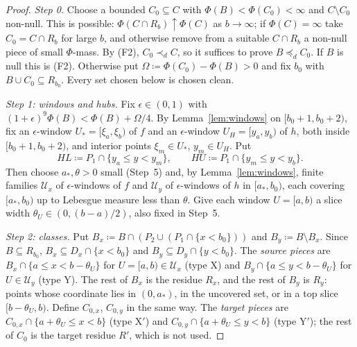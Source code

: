 \documentclass[11pt]{article}
\theoremstyle{definition}\newtheorem{definition}[theorem]{Definition}
\theoremstyle{remark}\newtheorem{remark}[theorem]{Remark}
\begin{document}
\begin{proof}
\emph{Step 0.} Choose a bounded $C_0\subseteq C$ with
$\Phi(B)<\Phi(C_0)<\infty$ and $C\setminus C_0$ non-null. This is possible:
$\Phi(C\cap R_b)\uparrow\Phi(C)$ as $b\to\infty$; if $\Phi(C)=\infty$ take
$C_0=C\cap R_b$ for large $b$, and otherwise remove from a suitable $C\cap
R_b$ a non-null piece of small $\Phi$-mass. By (F2), $C_0\prec_dC$, so it
suffices to prove $B\preceq_dC_0$. If $B$ is null this is (F2). Otherwise put
$\Omega\coloneqq\Phi(C_0)-\Phi(B)>0$ and fix $b_0$ with $B\cup C_0\subseteq
R_{b_0}$. Every set chosen below is chosen clean.

\emph{Step 1: windows and hubs.} Fix $\epsilon\in(0,1)$ with
$(1+\epsilon)^9\Phi(B)<\Phi(B)+\Omega/4$. By Lemma~\ref{lem:windows} on
$[b_0+1,b_0+2)$, fix an $\epsilon$-window $U_*=[\xi_a,\xi_b)$ of $f$ and an
$\epsilon$-window $U_H=[y_a,y_b)$ of $h$, both inside $[b_0+1,b_0+2)$, and
interior points $\xi_m\in U_*$, $y_m\in U_H$. Put
\[
 HL\coloneqq P_1\cap\{y_a\le y<y_m\},\qquad HU\coloneqq P_1\cap\{y_m\le
 y<y_b\}.
\]
Then choose $a_*,\theta>0$ small (Step~5) and, by Lemma~\ref{lem:windows},
finite families $\mathcal U_x$ of $\epsilon$-windows of $f$ and $\mathcal U_y$
of $\epsilon$-windows of $h$ in $[a_*,b_0)$, each covering $[a_*,b_0)$
up to Lebesgue measure less than $\theta$. Give each window $U=[a,b)$ a
slice width $\theta_U\in(0,(b-a)/2)$, also fixed in Step~5.

\emph{Step 2: classes.} Put $B_x\coloneqq B\cap(P_2\cup(P_1\cap\{x<b_0\}))$
and $B_y\coloneqq B\setminus B_x$. Since $B\subseteq R_{b_0}$, $B_x\subseteq
D_x\cap\{x<b_0\}$ and $B_y\subseteq D_y\cap\{y<b_0\}$. The \emph{source
pieces} are $B_x\cap\{a\le x<b-\theta_U\}$ for $U=[a,b)\in\mathcal U_x$ (type
X) and $B_y\cap\{a\le y<b-\theta_U\}$ for $U\in\mathcal U_y$ (type Y). The
rest of $B_x$ is the residue $R_x$, and the rest of $B_y$ is $R_y$: points
whose coordinate lies in $(0,a_*)$, in the uncovered set, or in a top slice
$[b-\theta_U,b)$. Define $C_{0,x}$, $C_{0,y}$ in the same way. The
\emph{target pieces} are $C_{0,x}\cap\{a+\theta_U\le x<b\}$ (type X$'$) and
$C_{0,y}\cap\{a+\theta_U\le y<b\}$ (type Y$'$); the rest of $C_0$ is the
target residue $R'$, which is not used.


\end{proof}
\end{document}
